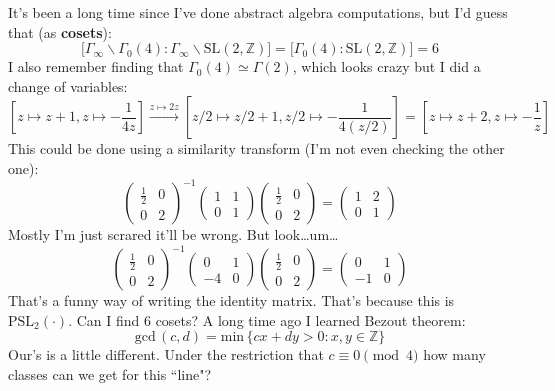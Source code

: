 \documentclass[12pt]{article}
\begin{document}
\noindent It's been a long time since I've done abstract algebra computations, but I'd guess that (as \textbf{cosets}):
$$  \big[ \Gamma_\infty \backslash \Gamma_0(4) : \Gamma_\infty \backslash \text{SL}(2, \mathbb{Z}) \big]  = \big[ \Gamma_0(4) : \text{SL}(2, \mathbb{Z}) \big] = 6 $$
I also remember finding that $\Gamma_0(4) \simeq \Gamma(2)$, which looks crazy but I did a change of variables:
$$ \left[ z \mapsto z + 1, z \mapsto - \frac{1}{4z} \right] \stackrel{z \mapsto 2z}{\to} 
\left[ z/2 \mapsto z/2 + 1, z/2 \mapsto - \frac{1}{4(z/2)} \right] 
= \left[ z \mapsto z + 2, z \mapsto - \frac{1}{z} \right]$$
This could be done using a similarity transform (I'm not even checking the other one):
$$ \left( \begin{array}{cc} \frac{1}{2} & 0 \\ 0 & 2\end{array} \right)^{-1} \left( \begin{array}{cc} 1 & 1 \\ 0 & 1\end{array} \right) \left( \begin{array}{cc} \frac{1}{2} & 0 \\ 0 & 2\end{array} \right) = \left( \begin{array}{cc} 1 & 2 \\ 0 & 1\end{array} \right)  $$
Mostly I'm just scrared it'll be wrong.  But look\dots um\dots 
$$ \left( \begin{array}{cc} \frac{1}{2} & 0 \\ 0 & 2\end{array} \right)^{-1} \left( \begin{array}{rc} 0 & 1 \\ -4 & 0\end{array} \right) \left( \begin{array}{cc} \frac{1}{2} & 0 \\ 0 & 2\end{array} \right) = \left( \begin{array}{rc} 0 & 1 \\ -1 & 0\end{array} \right)  $$
That's a funny way of writing the identity matrix.  That's because this is $\text{PSL}_2(\cdot)$.  Can I find 6 cosets? A long time ago I learned Bezout theorem:
$$ \text{gcd}\,(c,d) = \text{min} \, \big\{ cx + dy > 0 : x, y \in \mathbb{Z} \big\} $$
Our's is a little different.  Under the restriction that $ c \equiv 0 \pmod 4$ how many classes can we get for this ``line"?
\end{document}
